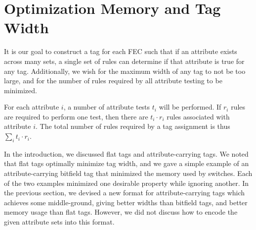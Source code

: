 

\section{Optimization Memory and Tag Width}



It is our goal to construct a tag for each FEC such that if an attribute exists across many sets, a single set of rules can determine if that attribute is true for any tag. Additionally, we wish for the maximum width of any tag to not be too large, and for the number of rules required by all attribute testing to be minimized. 

For each attribute $i$, a number of attribute tests $t_i$ will be performed. If $r_i$ rules are required to perform one test, then there are $t_i\cdot r_i$ rules associated with attribute $i$. The total number of rules required by a tag assignment is thus $\sum_i{t_i\cdot r_i}$. 


In the introduction, we discussed flat tags and attribute-carrying tags. We noted that flat tags optimally minimize tag width, and we gave a simple example of an attribute-carrying bitfield tag that minimized the memory used by switches. Each of the two examples minimized one desirable property while ignoring another. In the previous section, we devised a new format for attribute-carrying tags which achieves some middle-ground, giving better widths than bitfield tags, and better memory usage than flat tags. However, we did not discuss how to encode the given attribute sets into this format. 




